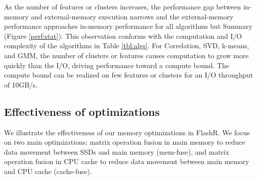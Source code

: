 As the number of features or clusters increases,
the performance gap between in-memory and external-memory execution
narrows and the external-memory performance approaches 
in-memory performance for all algorithms but Summary (Figure \ref{perf:stat}).
This observation conforms with the computation and I/O complexity of
the algorithms in Table \ref{tbl:algs}.
For Correlation, SVD, k-means, and GMM, the number of clusters or features causes computation
to grow more quickly than the I/O, driving performance toward a compute bound.
The compute bound can be realized on few features or clusters for an I/O throughput of 10GB/s.


\subsection{Effectiveness of optimizations}
We illustrate the effectiveness of our memory optimizations in FlashR.
We focus on two main optimizations: matrix operation fusion in main memory
to reduce data movement between SSDs and main memory (mem-fuse), and matrix
operation fusion in CPU cache to reduce data movement between main memory and
CPU cache (cache-fuse).

